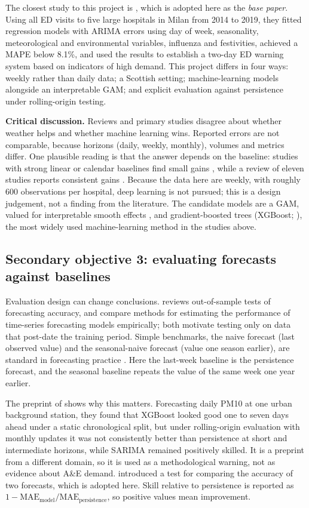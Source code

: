 \documentclass[12pt]{article}
\begin{document}
The closest study to this project is \textcite{murtas2022}, which is adopted here as the \emph{base paper}. Using all ED visits to five large hospitals in Milan from 2014 to 2019, they fitted regression models with ARIMA errors using day of week, seasonality, meteorological and environmental variables, influenza and festivities, achieved a MAPE below 8.1\%, and used the results to establish a two-day ED warning system based on indicators of high demand. This project differs in four ways: weekly rather than daily data; a Scottish setting; machine-learning models alongside an interpretable GAM; and explicit evaluation against persistence under rolling-origin testing.

\textbf{Critical discussion.} Reviews and primary studies disagree about whether weather helps and whether machine learning wins. Reported errors are not comparable, because horizons (daily, weekly, monthly), volumes and metrics differ. One plausible reading is that the answer depends on the baseline: studies with strong linear or calendar baselines find small gains \parencite{vollmer2021,marcilio2013}, while a review of eleven studies reports consistent gains \parencite{blanco2026}. Because the data here are weekly, with roughly 600 observations per hospital, deep learning is not pursued; this is a design judgement, not a finding from the literature. The candidate models are a GAM, valued for interpretable smooth effects \parencite{hastie1986}, and gradient-boosted trees (XGBoost; \cite{chen2016}), the most widely used machine-learning method in the studies above.

\subsection{Secondary objective 3: evaluating forecasts against baselines}
Evaluation design can change conclusions. \textcite{tashman2000} reviews out-of-sample tests of forecasting accuracy, and \textcite{cerqueira2020} compare methods for estimating the performance of time-series forecasting models empirically; both motivate testing only on data that post-date the training period. Simple benchmarks, the naive forecast (last observed value) and the seasonal-naive forecast (value one season earlier), are standard in forecasting practice \parencite{hyndman2021}. Here the last-week baseline is the persistence forecast, and the seasonal baseline repeats the value of the same week one year earlier.

The preprint of \textcite{garciacrespi2026} shows why this matters. Forecasting daily PM10 at one urban background station, they found that XGBoost looked good one to seven days ahead under a static chronological split, but under rolling-origin evaluation with monthly updates it was not consistently better than persistence at short and intermediate horizons, while SARIMA remained positively skilled. It is a preprint from a different domain, so it is used as a methodological warning, not as evidence about A\&E demand. \textcite{diebold1995} introduced a test for comparing the accuracy of two forecasts, which is adopted here. Skill relative to persistence is reported as $1-\mathrm{MAE}_{\text{model}}/\mathrm{MAE}_{\text{persistence}}$, so positive values mean improvement.
\end{document}
